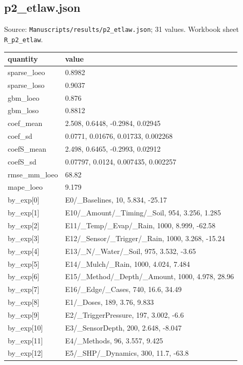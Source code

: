 \subsection*{p2\_etlaw.json}
\noindent\small Source: \nolinkurl{Manuscripts/results/p2_etlaw.json}; 31 values. Workbook sheet \texttt{R\_p2\_etlaw}.\par
{\scriptsize\begin{longtable}{p{}p{}}\toprule\textbf{quantity} & \textbf{value}\\\midrule\endhead
{}sparse\_loeo & 0.8982\\
{}sparse\_loso & 0.9037\\
{}gbm\_loeo & 0.876\\
{}gbm\_loso & 0.8812\\
{}coef\_mean & 2.508, 0.6448, -0.2984, 0.02945\\
{}coef\_sd & 0.0771, 0.01676, 0.01733, 0.002268\\
{}coefS\_mean & 2.498, 0.6465, -0.2993, 0.02912\\
{}coefS\_sd & 0.07797, 0.0124, 0.007435, 0.002257\\
{}rmse\_mm\_loeo & 68.82\\
{}mape\_loeo & 9.179\\
{}by\_exp[0] & E0/\_Baselines, 10, 5.834, -25.17\\
{}by\_exp[1] & E10/\_Amount/\_Timing/\_Soil, 954, 3.256, 1.285\\
{}by\_exp[2] & E11/\_Temp/\_Evap/\_Rain, 1000, 8.999, -62.58\\
{}by\_exp[3] & E12/\_Sensor/\_Trigger/\_Rain, 1000, 3.268, -15.24\\
{}by\_exp[4] & E13/\_N/\_Water/\_Soil, 975, 3.532, -3.65\\
{}by\_exp[5] & E14/\_Mulch/\_Rain, 1000, 4.024, 7.484\\
{}by\_exp[6] & E15/\_Method/\_Depth/\_Amount, 1000, 4.978, 28.96\\
{}by\_exp[7] & E16/\_Edge/\_Cases, 740, 16.6, 34.49\\
{}by\_exp[8] & E1/\_Doses, 189, 3.76, 9.833\\
{}by\_exp[9] & E2/\_TriggerPressure, 197, 3.002, -6.6\\
{}by\_exp[10] & E3/\_SensorDepth, 200, 2.648, -8.047\\
{}by\_exp[11] & E4/\_Methods, 96, 3.557, 9.425\\
{}by\_exp[12] & E5/\_SHP/\_Dynamics, 300, 11.7, -63.8\\

\end{longtable}}
